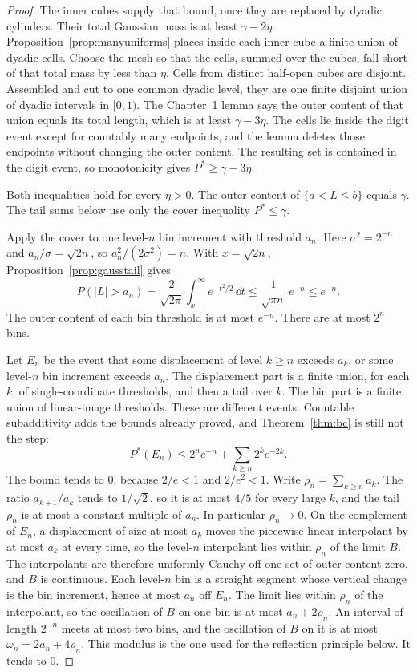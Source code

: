 \begin{proof}
The inner cubes supply that bound, once they are replaced by dyadic cylinders. Their total Gaussian mass is at least $\gamma-2\eta$. Proposition~\ref{prop:manyuniforms} places inside each inner cube a finite union of dyadic cells. Choose the mesh so that the cells, summed over the cubes, fall short of that total mass by less than $\eta$. Cells from distinct half-open cubes are disjoint. Assembled and cut to one common dyadic level, they are one finite disjoint union of dyadic intervals in $[0,1)$. The Chapter~1 lemma says the outer content of that union equals its total length, which is at least $\gamma-3\eta$. The cells lie inside the digit event except for countably many endpoints, and the lemma deletes those endpoints without changing the outer content. The resulting set is contained in the digit event, so monotonicity gives $P^*\ge\gamma-3\eta$.

Both inequalities hold for every $\eta>0$. The outer content of $\{a<L\le b\}$ equals $\gamma$. The tail sums below use only the cover inequality $P^*\le\gamma$.

Apply the cover to one level-$n$ bin increment with threshold $a_n$. Here $\sigma^2=2^{-n}$ and $a_n/\sigma=\sqrt{2n}$, so $a_n^2/(2\sigma^2)=n$. With $x=\sqrt{2n}$, Proposition~\ref{prop:gausstail} gives
\[
 P(|L|>a_n)
 =\frac{2}{\sqrt{2\pi}}\int_x^{\infty}e^{-t^2/2}\,\dd t
 \le\frac{1}{\sqrt{\pi n}}\,e^{-n}
 \le e^{-n}.
\]
The outer content of each bin threshold is at most $e^{-n}$. There are at most $2^n$ bins.

Let $E_n$ be the event that some displacement of level $k\ge n$ exceeds $a_k$, or some level-$n$ bin increment exceeds $a_n$. The displacement part is a finite union, for each $k$, of single-coordinate thresholds, and then a tail over $k$. The bin part is a finite union of linear-image thresholds. These are different events. Countable subadditivity adds the bounds already proved, and Theorem~\ref{thm:bc} is still not the step:
\[
 P^*(E_n)\le 2^n e^{-n}+\sum_{k\ge n}2^k e^{-2k}.
\]
The bound tends to $0$, because $2/e<1$ and $2/e^2<1$. Write $\rho_n=\sum_{k\ge n}a_k$. The ratio $a_{k+1}/a_k$ tends to $1/\sqrt2$, so it is at most $4/5$ for every large $k$, and the tail $\rho_n$ is at most a constant multiple of $a_n$. In particular $\rho_n\to0$. On the complement of $E_n$, a displacement of size at most $a_k$ moves the piecewise-linear interpolant by at most $a_k$ at every time, so the level-$n$ interpolant lies within $\rho_n$ of the limit $B$. The interpolants are therefore uniformly Cauchy off one set of outer content zero, and $B$ is continuous. Each level-$n$ bin is a straight segment whose vertical change is the bin increment, hence at most $a_n$ off $E_n$. The limit lies within $\rho_n$ of the interpolant, so the oscillation of $B$ on one bin is at most $a_n+2\rho_n$. An interval of length $2^{-n}$ meets at most two bins, and the oscillation of $B$ on it is at most $\omega_n=2a_n+4\rho_n$. This modulus is the one used for the reflection principle below. It tends to $0$.


\end{proof}

